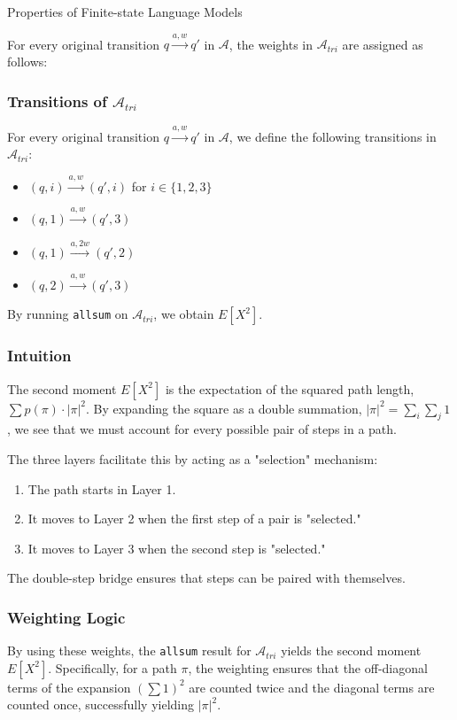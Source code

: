 \begin{question}{Properties of Finite-state Language Models}
\begin{subquestion}
For every original transition $q \xrightarrow{a, w} q'$ in $\mathcal{A}$, the weights in $\mathcal{A}_{tri}$ are assigned as follows:

\subsubsection*{Transitions of $\mathcal{A}_{tri}$}

For every original transition $q \xrightarrow{a, w} q'$ in $\mathcal{A}$, we define the following transitions in $\mathcal{A}_{tri}$:

\begin{itemize}
    \item $(q, i) \xrightarrow{a, w} (q', i)$ for $i \in \{1, 2, 3\}$
    \item $(q, 1) \xrightarrow{a, w} (q', 3)$
    \item $(q, 1) \xrightarrow{a, 2w} (q', 2)$
    \item $(q, 2) \xrightarrow{a, w} (q', 3)$
\end{itemize}

By running \texttt{allsum} on $\mathcal{A}_{tri}$, we obtain $E[X^2]$.

\subsubsection*{Intuition}

The second moment $E[X^2]$ is the expectation of the squared path length, $\sum p(\pi) \cdot |\pi|^2$. By expanding the square as a double summation, $|\pi|^2 = \sum_{i} \sum_{j} 1$, we see that we must account for every possible pair of steps in a path. 

The three layers facilitate this by acting as a "selection" mechanism:
\begin{enumerate}
    \item The path starts in Layer 1.
    \item It moves to Layer 2 when the first step of a pair is "selected."
    \item It moves to Layer 3 when the second step is "selected."
\end{enumerate}
The double-step bridge ensures that steps can be paired with themselves.

\subsubsection*{Weighting Logic}

By using these weights, the \texttt{allsum} result for $\mathcal{A}_{tri}$ yields the second moment $E[X^2]$. Specifically, for a path $\pi$, the weighting ensures that the off-diagonal terms of the expansion $(\sum 1)^2$ are counted twice and the diagonal terms are counted once, successfully yielding $|\pi|^2$.


\end{subquestion}
\end{question}
